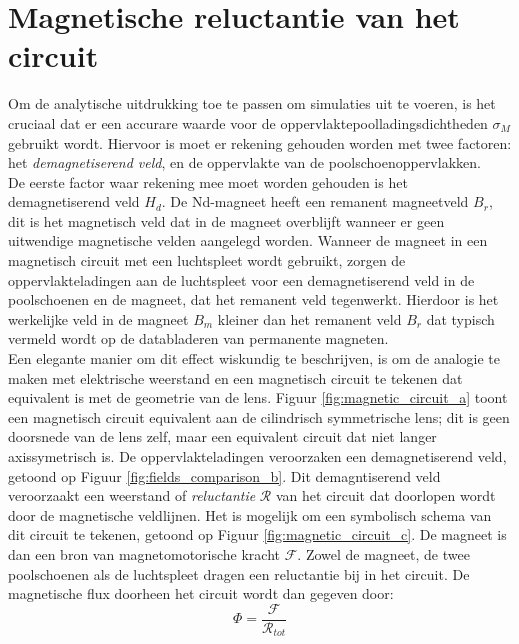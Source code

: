 \documentclass[we,twoside,openright,a4paper,11pt]{uantwerpenbamathesis}
\begin{document}
\section{Magnetische reluctantie van het circuit}\label{ch:reluctantie}
Om de analytische uitdrukking toe te passen om simulaties uit te voeren, is het cruciaal dat er een accurare waarde voor de oppervlaktepoolladingsdichtheden $\sigma_M$ gebruikt wordt. Hiervoor is moet er rekening gehouden worden met twee factoren: het \textit{demagnetiserend veld}, en de oppervlakte van de poolschoenoppervlakken.\\

De eerste factor waar rekening mee moet worden gehouden is het demagnetiserend veld $H_d$. De Nd-magneet heeft een remanent magneetveld $B_r$, dit is het magnetisch veld dat in de magneet overblijft wanneer er geen uitwendige magnetische velden aangelegd worden. Wanneer de magneet in een magnetisch circuit met een luchtspleet wordt gebruikt, zorgen de oppervlakteladingen aan de luchtspleet voor een demagnetiserend veld in de poolschoenen en de magneet, dat het remanent veld tegenwerkt. Hierdoor is het werkelijke veld in de magneet $B_m$ kleiner dan het remanent veld $B_r$ dat typisch vermeld wordt op de databladeren van permanente magneten.\\

Een elegante manier om dit effect wiskundig te beschrijven, is om de analogie te maken met elektrische weerstand en een magnetisch circuit te tekenen dat equivalent is met de geometrie van de lens. Figuur \ref{fig:magnetic_circuit_a} toont een magnetisch circuit equivalent aan de cilindrisch symmetrische lens; dit is geen doorsnede van de lens zelf, maar een equivalent circuit dat niet langer axissymetrisch is. De oppervlakteladingen veroorzaken een demagnetiserend veld, getoond op Figuur \ref{fig:fields_comparison_b}. Dit demagntiserend veld veroorzaakt een weerstand of \textit{reluctantie} $\mathcal{R}$ van het circuit dat doorlopen wordt door de magnetische veldlijnen. Het is mogelijk om een symbolisch schema van dit circuit te tekenen, getoond op Figuur \ref{fig:magnetic_circuit_c}. De magneet is dan een bron van magnetomotorische kracht $\mathcal{F}$. Zowel de magneet, de twee poolschoenen als de luchtspleet dragen een reluctantie bij in het circuit. De magnetische flux doorheen het circuit wordt dan gegeven door:
\begin{equation}\label{eq:flux_mmf_reluctance}
    \Phi = \frac{\mathcal{F}}{\mathcal{R}_{tot}}
\end{equation}
\end{document}
